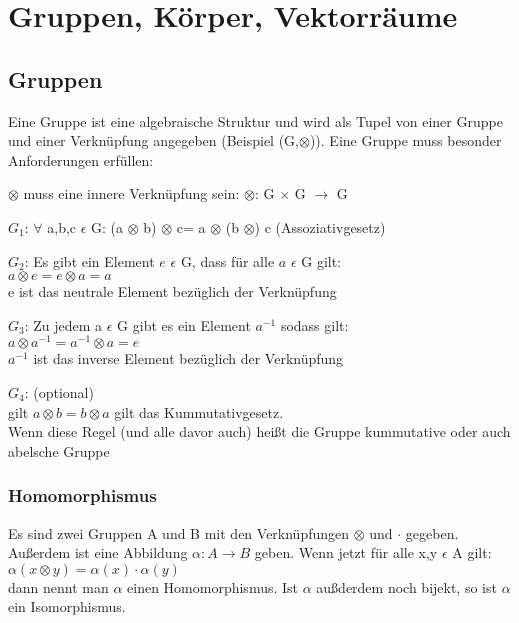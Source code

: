 \documentclass[a4paper,10pt]{scrartcl}
\begin{document}
    \section{Gruppen, Körper, Vektorräume}
        \subsection{Gruppen}
            Eine Gruppe ist eine algebraische Struktur und wird als Tupel von einer Gruppe und einer Verknüpfung angegeben (Beispiel (G,$\otimes$)). Eine Gruppe muss 
            besonder Anforderungen erfüllen: 
            \begin{description}
                \item $\otimes$ muss eine innere Verknüpfung sein: $\otimes$: G $\times$ G $\rightarrow$ G 
                \item $G_1$: $\forall$ a,b,c $\epsilon$ G: (a $\otimes$ b) $\otimes$ c= a $\otimes$ (b $\otimes$) c (Assoziativgesetz)
                \item $G_2$: Es gibt ein Element $e$ $\epsilon$ G, dass für alle $a$ $\epsilon$ G gilt:\\ $a \otimes e = e \otimes a = a$ \\ e ist das neutrale Element bezüglich der Verknüpfung
                \item $G_3$: Zu jedem a $\epsilon$ G gibt es ein Element $a^{-1}$ sodass gilt: \\ $a \otimes a^{-1} = a^{-1} \otimes a = e$ \\ $a^{-1}$ ist das inverse Element bezüglich der Verknüpfung
                \item $G_4$: (optional) \\ gilt $a \otimes b = b \otimes a$ gilt das Kummutativgesetz. \\Wenn diese Regel (und alle davor auch) heißt die Gruppe kummutative oder auch abelsche Gruppe
            \end{description}
            \subsubsection{Homomorphismus}
                Es sind zwei Gruppen A und B mit den Verknüpfungen $\otimes$ und $\cdot$ gegeben. \\
                Außerdem ist eine Abbildung $\alpha: A \rightarrow B$ geben. Wenn jetzt für alle x,y $\epsilon$ A gilt:\\
                $\alpha(x \otimes y) = \alpha(x) \cdot \alpha(y)$\\
                dann nennt man $\alpha$ einen Homomorphismus. Ist $\alpha$ außderdem noch bijekt, so ist $\alpha$ ein Isomorphismus.  
\end{document}
